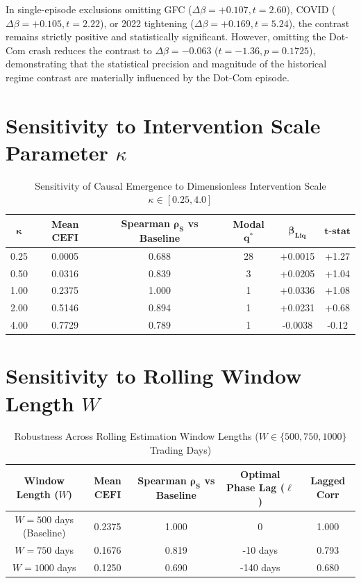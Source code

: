 \documentclass[12pt]{article}
\begin{document}
In single-episode exclusions omitting GFC ($\Delta \beta = +0.107, t = 2.60$), COVID ($\Delta \beta = +0.105, t = 2.22$), or 2022 tightening ($\Delta \beta = +0.169, t = 5.24$), the contrast remains strictly positive and statistically significant. However, omitting the Dot-Com crash reduces the contrast to $\Delta \beta = -0.063$ ($t = -1.36, p = 0.1725$), demonstrating that the statistical precision and magnitude of the historical regime contrast are materially influenced by the Dot-Com episode.

\section{Sensitivity to Intervention Scale Parameter \texorpdfstring{$\kappa$}{kappa}}
\label{app:kappa_sensitivity}

\begin{table}[htbp]
\centering
\caption{Sensitivity of Causal Emergence to Dimensionless Intervention Scale $\kappa \in [0.25, 4.0]$}
\label{tab:app_kappa}
\begin{tabular}{cccccc}
\toprule
$\mathbf{\kappa}$ & \textbf{Mean } $\mathbf{CEFI}$ & \textbf{Spearman } $\mathbf{\rho_S}$ vs Baseline & \textbf{Modal } $\mathbf{q^*}$ & $\mathbf{\beta_{\text{Liq}}}$ & $\mathbf{t\text{-stat}}$ \\
\midrule
0.25 & 0.0005 & 0.688 & 28 & +0.0015 & +1.27 \\
0.50 & 0.0316 & 0.839 & 3  & +0.0205 & +1.04 \\
1.00 & 0.2375 & 1.000 & 1  & +0.0336 & +1.08 \\
2.00 & 0.5146 & 0.894 & 1  & +0.0231 & +0.68 \\
4.00 & 0.7729 & 0.789 & 1  & -0.0038 & -0.12 \\
\bottomrule
\end{tabular}
\end{table}

\section{Sensitivity to Rolling Window Length \texorpdfstring{$W$}{W}}
\label{app:window_length}

\begin{table}[htbp]
\centering
\caption{Robustness Across Rolling Estimation Window Lengths ($W \in \{500, 750, 1000\}$ Trading Days)}
\label{tab:app_window}
\begin{tabular}{ccccc}
\toprule
\textbf{Window Length ($W$)} & \textbf{Mean } $\mathbf{CEFI}$ & \textbf{Spearman } $\mathbf{\rho_S}$ vs Baseline & \textbf{Optimal Phase Lag ($\ell$)} & \textbf{Lagged Corr} \\
\midrule
$W = 500$ days (Baseline) & 0.2375 & 1.000 & 0 & 1.000 \\
$W = 750$ days            & 0.1676 & 0.819 & -10 days & 0.793 \\
$W = 1000$ days           & 0.1250 & 0.690 & -140 days & 0.680 \\
\bottomrule
\end{tabular}
\end{table}
\end{document}
